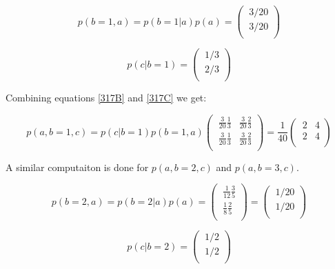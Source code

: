 \documentclass[11pt,a4paper,oneside]{report}
\begin{document}
 
\begin{equation}
\label{317B}
    p(b = 1, a) = p(b = 1|a) p(a) = \begin{pmatrix}
      \ 3/20 \\[0.4em]
      \ 3/20 \\
    \end{pmatrix}
\end{equation}

\begin{equation}
\label{317C}
p(c | b = 1) =  
  \begin{pmatrix}
   \ 1/3 \\[0.4em]
   \ 2/3 \\
 \end{pmatrix} 
\end{equation}

Combining equations \eqref{317B} and \eqref{317C} we get:

\begin{equation}
\label{317D}
p(a, b = 1, c) =  p(c | b = 1 )p(b = 1,a)
  \begin{pmatrix}
   \ \frac{3}{20} \frac{1}{3} & \frac{3}{20} \frac{2}{3} \\[0.4em]
   \ \frac{3}{20} \frac{1}{3} & \frac{3}{20} \frac{2}{3} \\
 \end{pmatrix} = \frac{1}{40}
  \begin{pmatrix}
   \ 2 & 4 \\[0.4em]
   \ 2 & 4 \\
 \end{pmatrix} 
\end{equation}

A similar computaiton is done for $p(a, b = 2, c)$ and $p(a, b = 3, c)$. 


\begin{equation}
\label{317E}
    p(b = 2, a) = p(b = 2|a) p(a) = 
    \begin{pmatrix}
      \ \frac{1}{12} \frac{3}{5} \\[0.4em]
      \ \frac{1}{8} \frac{2}{5} \\
    \end{pmatrix} = 
    \begin{pmatrix}
      \ 1/20 \\[0.4em]
      \ 1/20 \\
    \end{pmatrix}
\end{equation}

\begin{equation}
\label{317F}
p(c | b = 2) =  
  \begin{pmatrix}
   \ 1/2 \\[0.4em]
   \ 1/2 \\
 \end{pmatrix} 
\end{equation}
\end{document}
